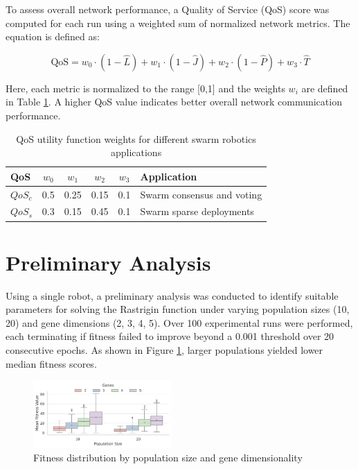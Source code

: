 \documentclass[conference]{IEEEtran}
\begin{document}
To assess overall network performance, a Quality of Service (QoS) score was computed for each run using a weighted sum of normalized network metrics. The equation is defined as:

\begin{equation}
\mathrm{QoS} = w_0 \cdot (1 - \hat{L}) + w_1 \cdot (1 - \hat{J}) + w_2 \cdot (1 - \hat{P}) + w_3 \cdot \hat{T}
\end{equation}

Here, each metric is normalized to the range [0,1] and the weights $w_i$ are defined in Table \ref{tab:qos}. A higher QoS value indicates better overall network communication performance.

\begin{table}[H]
\centering
\caption{QoS utility function weights for different swarm robotics applications}
\label{tab:qos}
  \begin{tabular}{@{} lcccc p{3.5cm} @{}}
  \toprule
  \textbf{QoS} & \textbf{$w_0$} & \textbf{$w_1$} & \textbf{$w_2$} & \textbf{$w_3$} & \textbf{Application} \\
  \midrule
  $QoS_c$      & 0.5 & 0.25   & 0.15   & 0.1     & Swarm consensus and voting     \\
  $QoS_s$      & 0.3 & 0.15   & 0.45   & 0.1     & Swarm sparse deployments       \\
  \bottomrule
  \end{tabular}
\end{table}

\section{Preliminary Analysis}

Using a single robot, a preliminary analysis was conducted to identify suitable parameters for solving the Rastrigin function under varying population sizes (10, 20) and gene dimensions (2, 3, 4, 5). Over 100 experimental runs were performed, each terminating if fitness failed to improve beyond a 0.001 threshold over 20 consecutive epochs. As shown in Figure \ref{fig:ga_prelim_analysis}, larger populations yielded lower median fitness scores.

\begin{figure}[h]
    \centering
    \includegraphics[width=0.47\textwidth]{ga_prelim_analysis_v2.pdf}
    \caption{Fitness distribution by population size and gene dimensionality}
    \label{fig:ga_prelim_analysis}
\end{figure}
\end{document}
